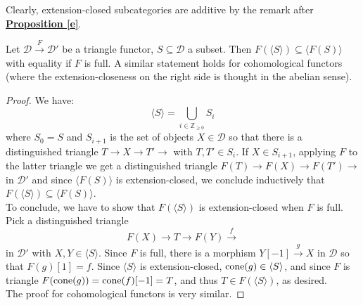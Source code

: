 Clearly, extension-closed subcategories are additive by the remark after \hyperref[e]{\textbf{Proposition \ref*{e}}}. \\

\begin{prop}\label{f}
Let $\mathscr{D} \overset{F}{\longrightarrow} \mathscr{D}'$ be a triangle functor, $S \subseteq \mathscr{D}$ a subset. Then $F(\langle S \rangle) \subseteq \langle F(S) \rangle$ with equality if $F$ is full. A similar statement holds for cohomological functors (where the extension-closeness on the right side is thought in the abelian sense). 
\end{prop}

\begin{proof}
 We have: $$\langle S \rangle = \bigcup_{i \in \mathbb{Z}_{\ge 0}} S_i$$
 where $S_0=S$ and $S_{i+1}$ is the set of objects $X \in \mathscr{D}$ so that there is a distinguished triangle $T \longrightarrow X \longrightarrow T' \longrightarrow$ with $T, T' \in S_i$. If $X \in S_{i+1}$, applying $F$ to the latter triangle we get a distinguished triangle $F(T) \longrightarrow F(X) \longrightarrow F(T') \longrightarrow$ in $\mathscr{D}'$ and since $\langle F(S) \rangle$ is extension-closed, we conclude inductively that $F(\langle S \rangle) \subseteq \langle F(S) \rangle$. \\
 To conclude, we have to show that $F(\langle S \rangle)$ is extension-closed when $F$ is full. Pick a distinguished triangle $$F(X) \longrightarrow T \longrightarrow F(Y) \overset{f}{\longrightarrow}$$
 in $\mathscr{D}'$ with $X,Y \in \langle S \rangle$. Since $F$ is full, there is a morphism $Y[-1] \overset{g}{\longrightarrow} X$ in $\mathscr{D}$ so that $F(g)[1]=f$. Since $\langle S \rangle$ is extension-closed, $\textnormal{cone}(g) \in \langle S \rangle$, and since $F$ is triangle $F(\textnormal{cone}(g))=\textnormal{cone}(f)[-1]=T$, and thus $T \in F(\langle S \rangle)$, as desired. \\
The proof for cohomological functors is very similar. 
\end{proof}

